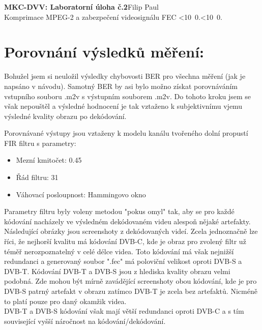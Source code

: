\documentclass[10pt, a4paper]{article}%
\def\mydate{\leavevmode\hbox{\twodigits\day.\twodigits\month.\the\year}}
\def\twodigits#1{\ifnum#1<10 0\fi\the#1}
\begin{document}
\begin{flushleft}%
	\textbf{\Large{MKC-DVV: Laboratorní úloha č.2}}\hfill Filip Paul\\
	\large{Komprimace MPEG-2 a zabezpečení videosignálu FEC \hfill\mydate}

\end{flushleft}
\section{\Large Porovnání výsledků měření:}
Bohužel jsem si neuložil výsledky chybovosti BER pro všechna měření (jak je napsáno v návodu).
Samotný BER by asi bylo možno získat porovnáváním vstupního souboru .m2v s výstupním souborem .m2v.
Do tohoto kroku jsem se však nepouštěl a výsledné hodnocení je tak vztaženo k subjektivnímu
vjemu výsledné kvality obrazu po dekódování.

\noindent Porovnávané výstupy jsou vztaženy k modelu kanálu tvořeného dolní propustí FIR filtru s parametry:
\begin{itemize}
    \item Mezní kmitočet: 0.45
    \item Řád filtru: 31
    \item Váhovací posloupnost: Hammingovo okno
\end{itemize}
Parametry filtru byly voleny metodou "pokus omyl" tak, aby se pro každé kódování nacházely ve výsledném dekódovaném videu alespoň nějaké artefakty.
Následující obrázky jsou screenshoty z dekódovaných videí. Zcela jednoznačně lze říci, že nejhorší kvalitu má kódování DVB-C, kde je obraz
pro zvolený filtr už téměř nerozpoznatelný v celé délce videa. Toto kódování má však nejnižší redundanci a generovaný soubor ".fec" má poloviční
velikost oproti DVB-S a DVB-T.
Kódování DVB-T a DVB-S jsou z hlediska kvality obrazu velmi podobná. Zde mohou být mírně zavádějící screenshoty obou kódování, kde je pro DVB-S patrný
artefakt v obrazu zatímco DVB-T je zcela bez artefaktů. Nicméně to platí pouze pro daný okamžik videa.\\
DVB-T a DVB-S kódování však mají větší redundanci oproti DVB-C a s tím související vyšší náročnost na kódování/dekódování.
\end{document}
